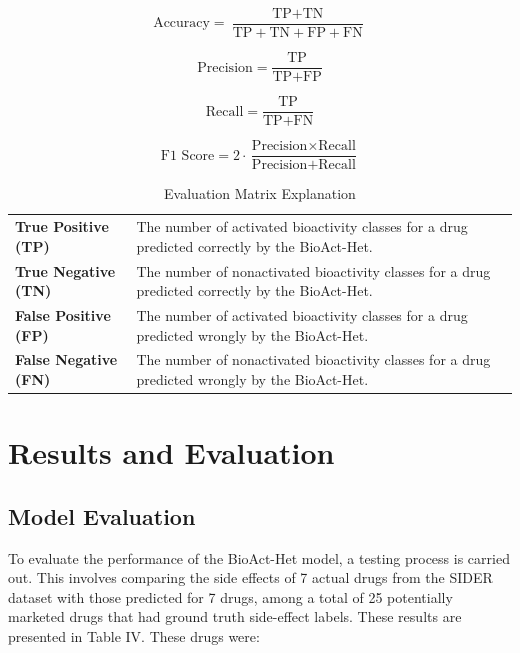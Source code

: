 \documentclass[conference]{IEEEtran}
\begin{document}
\[
  \text{Accuracy} = \frac{\text{TP} + \text{TN}}{\text{TP} + \text{TN} + \text{FP} + \text{FN}}
\]

\[
  \text{Precision} = \frac{\text{TP}}{\text{TP} + \text{FP}}
\]

\[
  \text{Recall} = \frac{\text{TP}}{\text{TP} + \text{FN}}
\]

\[
  \text{F1 Score} = 2 \cdot \frac{\text{Precision} \times \text{Recall}}{\text{Precision} + \text{Recall}}
\]

\begin{table}[h!]
  \centering
  \caption{Evaluation Matrix Explanation}
  \label{tab:Prediction_Definition}
  \begin{tabular}{|>{\raggedright\arraybackslash}p{2.5cm}|>{\raggedright\arraybackslash}p{6cm}|}
    \hline
    \rowcolor{headercolor}
    \multicolumn{1}{|c|}{\textbf{Prediction}} & \multicolumn{1}{c|}{\textbf{Definition}}                                                         \\ \hline
    \textbf{True Positive (TP)}               & The number of activated bioactivity classes for a drug predicted correctly by the BioAct-Het.    \\ \hline
    \textbf{True Negative (TN)}               & The number of nonactivated bioactivity classes for a drug predicted correctly by the BioAct-Het. \\ \hline
    \textbf{False Positive (FP)}              & The number of activated bioactivity classes for a drug predicted wrongly by the BioAct-Het.      \\ \hline
    \textbf{False Negative (FN)}              & The number of nonactivated bioactivity classes for a drug predicted wrongly by the BioAct-Het.   \\ \hline
  \end{tabular}
\end{table}


\section{Results and Evaluation}
\subsection{Model Evaluation}
To evaluate the performance of the BioAct-Het model, a testing process is carried out. This involves comparing the side effects of 7 actual drugs from the SIDER dataset with those predicted for 7 drugs, among a total of 25 potentially marketed drugs that had ground truth side-effect labels. These results are presented in Table IV.
These drugs were:\\
\end{document}
